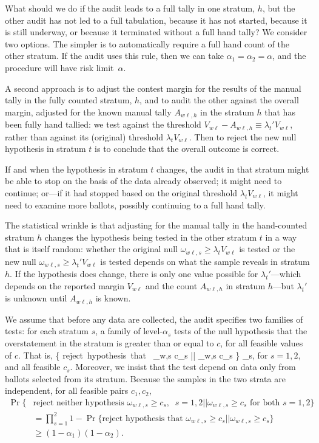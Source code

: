 What should we do if the audit leads to a full tally in one stratum, $h$,
but the other audit has not led to a full tabulation, because it 
has not started, because it is still underway, or because it terminated without
a full hand tally?
We consider two options.
The simpler is to automatically require a full hand count of the other stratum. 
If the audit uses this rule, then we can take $\alpha_1 = \alpha_2 = \alpha$, 
and the procedure will have risk limit~$\alpha$.

A second approach is to adjust the contest margin for the results of the manual 
tally in the fully counted stratum, $h$, and to audit the other
against the overall margin, adjusted for the known manual tally $A_{w\ell,h}$
in the stratum $h$ that has been fully hand tallied:
we test against the threshold 
$V_{w\ell} - A_{w\ell,h} \equiv \lambda_t' V_{w\ell}$, rather than 
against its (original) threshold $\lambda_t V_{w\ell}$.
Then to reject the new null hypothesis in stratum $t$ is to conclude that the 
overall outcome is correct.

If and when the hypothesis in stratum $t$ changes, the audit
in that stratum might be able to stop on the basis of the data already observed;
it might need to continue; or---if it had stopped based on the original threshold
$\lambda_t V_{w\ell}$, it might need to examine more ballots, possibly
continuing to a full hand tally.

The statistical wrinkle is that adjusting for the manual tally in the hand-counted 
stratum $h$
changes the hypothesis being tested in the other stratum $t$
in a way that is itself random:
whether the original null $\omega_{w\ell,s} \ge \lambda_t V_{w\ell}$ is tested
or the new null $\omega_{w\ell,s} \ge \lambda_t' V_{w\ell}$ is tested depends on what the 
sample reveals in stratum $h$.
If the hypothesis does change, there is only one value possible for $\lambda_t'$---which
depends on the reported margin $V_{w\ell}$ and the count $A_{w\ell,h}$ in 
stratum $h$---but $\lambda_t'$ is unknown until $A_{w\ell,h}$ is known.

We assume that before any data are collected, the audit specifies two families of tests:
for each stratum $s$, a family of level-$\alpha_s$ tests of the null hypothesis that 
the overstatement in the stratum is greater than or equal to $c$, for all feasible values of $c$.
That is,
\beq
    \Pr \{ \mbox{reject hypothesis that } \omega_{w\ell,s} \ge 
    c_s || \omega_{w\ell,s} \ge c_s \} \le \alpha_s,
\eeq
for $s = 1, 2$, and all feasible $c_s$.
Moreover, we insist that the test depend on data only from ballots selected from its stratum.
Because the samples in the two strata are independent, for all feasible pairs $c_1, c_2$,
\begin{align} \label{eq:stratum_families}
    \Pr\{&\mbox{reject neither hypothesis } \omega_{w\ell,s} \ge c_s, \;\; s=1, 2 ||
       \omega_{w\ell,s} \ge c_s  \mbox{ for both } s=1, 2 \} \nonumber \\ 
       &= \prod_{s=1}^2 1 - \Pr \{ \mbox{reject hypothesis that } \omega_{w\ell,s} \ge c_s || \omega_{w\ell,s} \ge c_s \} \nonumber \\
       & \ge (1-\alpha_1)(1-\alpha_2).
\end{align}


